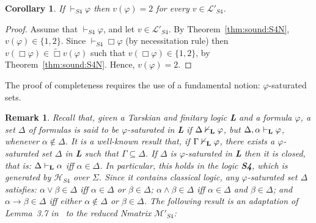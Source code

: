 \documentclass[12pt]{article}
\newtheorem{corollary}{Corollary}[theorem]
\newtheorem{remark}[theorem]{Remark}
\newcommand{\sfo}{\textbf{S4}}
\begin{document}
\begin{corollary} \label{valid_S4=2}
If $\vdash_{S4} \varphi$ then $v(\varphi)=2$ for every $v \in \mathcal{L}'_{S4}$.
\end{corollary}
\begin{proof}
Assume that $\vdash_{S4} \varphi$, and let $v \in \mathcal{L}'_{S4}$. By Theorem~\ref{thm:sound:S4N}, $v(\varphi) \in \{1,2\}$. Since  $\vdash_{S4} \Box\varphi$ (by necessitation rule) then $v(\Box\varphi) \in \tilde{\Box} v(\varphi)$ such that  $v(\Box\varphi)\in \{1,2\}$, by Theorem~\ref{thm:sound:S4N}. Hence,  $v(\varphi) = 2$.
\end{proof}



The proof of completeness requires the use of a fundamental notion: $\varphi$-saturated sets.

\begin{remark} \label{varphi-sat-sets}
Recall that, given a Tarskian and finitary logic {\bf L} and a formula  $\varphi$, a set $\Delta$ of formulas is said to be {\em  $\varphi$-saturated in {\bf L}}  if $\Delta \nvdash_{\bf L} \varphi$, but $\Delta,\alpha \vdash_{\bf L} \varphi$, whenever $\alpha \notin\Delta$. It is a well-known result that, if $\Gamma \nvdash_{\bf L} \varphi$, there exists a $\varphi$-saturated set $\Delta$ in {\bf L} such that $\Gamma \subseteq \Delta$. If $\Delta$ is $\varphi$-saturated in {\bf L} then it is closed, that is: $\Delta \vdash_{\bf L} \alpha$ iff $\alpha \in \Delta$. In particular, this holds in the logic \sfo, which is generated  by $\mathcal{H}_{S4}$ over $\Sigma$. Since it contains classical logic, any $\varphi$-saturated set $\Delta$ satisfies: $\alpha \vee \beta \in \Delta$ iff $\alpha \in \Delta$ or $\beta \in \Delta$; $\alpha \land \beta \in \Delta$ iff $\alpha \in \Delta$ and $\beta \in \Delta$; and $\alpha \to \beta \in \Delta$ iff either $\alpha \notin \Delta$ or $\beta \in \Delta$. The following result is an adaptation of Lemma~3.7 in~\cite{gratz_truth_2022} to the reduced Nmatrix $\mathcal{M}'_{S4}$:
\end{remark}
\end{document}
